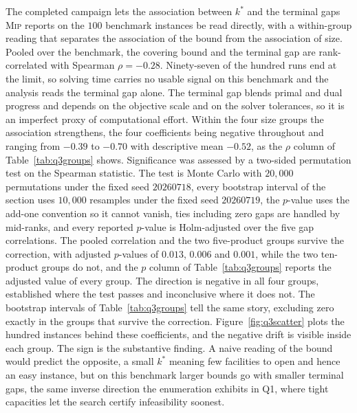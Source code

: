 The completed campaign lets the association between $k^\ast$ and the
terminal gaps \textsc{Mip} reports on the $100$ benchmark instances be
read directly, with a within-group reading that separates the
association of the bound from the association of size. Pooled over the benchmark, the covering
bound and the terminal gap are rank-correlated with Spearman
$\rho=-0.28$. Ninety-seven of the hundred runs end at the limit, so
solving time carries no usable signal on this benchmark and the analysis
reads the terminal gap alone. The terminal gap blends primal and dual
progress and depends on the objective scale and on the solver
tolerances, so it is an imperfect proxy of computational effort.
Within the four size groups the association strengthens, the four
coefficients being negative throughout and ranging from
$-0.39$ to $-0.70$ with descriptive mean $-0.52$, as the $\rho$ column
of Table~\ref{tab:q3groups}
shows. Significance was assessed by a two-sided permutation test on the
Spearman statistic. The test is Monte Carlo with $20{,}000$
permutations under the fixed seed $20260718$, every bootstrap interval
of the section uses $10{,}000$ resamples under the fixed seed
$20260719$, the $p$-value uses the add-one
convention so it cannot vanish, ties including zero gaps are handled by
mid-ranks, and every reported $p$-value is Holm-adjusted over the five
gap correlations. The pooled correlation and the two five-product
groups survive the correction, with adjusted $p$-values of $0.013$,
$0.006$ and $0.001$, while the two ten-product groups do not, and the
$p$ column of Table~\ref{tab:q3groups} reports the adjusted value of
every group. The direction is negative in all four groups, established
where the test passes and inconclusive where it does not. The bootstrap
intervals of Table~\ref{tab:q3groups} tell the same story, excluding
zero exactly in the groups that survive the correction.
Figure~\ref{fig:q3scatter} plots the hundred instances behind these
coefficients, and the negative drift is visible inside each group.
The sign is the substantive finding. A naive reading
of the bound would predict the opposite, a small $k^\ast$ meaning few
facilities to open and hence an easy instance, but on this benchmark
larger bounds go with smaller terminal gaps, the same inverse direction
the enumeration exhibits in Q1, where tight capacities let the search
certify infeasibility soonest.

